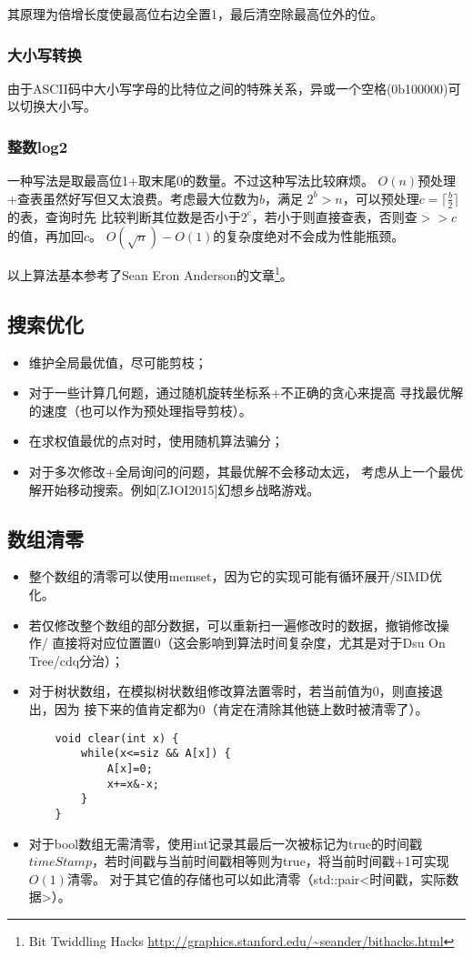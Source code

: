 其原理为倍增长度使最高位右边全置1，最后清空除最高位外的位。
\subsubsection{大小写转换}
由于ASCII码中大小写字母的比特位之间的特殊关系，异或一个空格(0b100000)可以切换大小写。

\subsubsection{整数log2}
一种写法是取最高位1+取末尾0的数量。不过这种写法比较麻烦。
$O(n)$预处理+查表虽然好写但又太浪费。考虑最大位数为$b$，满足
$2^b>n$，可以预处理$c=\lceil \frac{b}{2}\rceil$的表，查询时先
比较判断其位数是否小于$2^c$，若小于则直接查表，否则查$>>c$的值，再加回$c$。
$O(\sqrt{n})-O(1)$的复杂度绝对不会成为性能瓶颈。

以上算法基本参考了Sean Eron Anderson的文章\footnote{
    Bit Twiddling Hacks
    \url{http://graphics.stanford.edu/\~seander/bithacks.html}
}。
\subsection{搜索优化}
\begin{itemize}
    \item 维护全局最优值，尽可能剪枝；
    \item 对于一些计算几何题，通过随机旋转坐标系+不正确的贪心来提高
    寻找最优解的速度（也可以作为预处理指导剪枝）。
    \item 在求权值最优的点对时，使用随机算法骗分；
    \item 对于多次修改+全局询问的问题，其最优解不会移动太远，
    考虑从上一个最优解开始移动搜索。例如[ZJOI2015]幻想乡战略游戏。
\end{itemize}
\subsection{数组清零}
\begin{itemize}
    \item 整个数组的清零可以使用memset，因为它的实现可能有循环展开/SIMD优化。
    \item 若仅修改整个数组的部分数据，可以重新扫一遍修改时的数据，撤销修改操作/
    直接将对应位置置0（这会影响到算法时间复杂度，尤其是对于Dsu On Tree/cdq分治）；
    \item 对于树状数组，在模拟树状数组修改算法置零时，若当前值为0，则直接退出，因为
    接下来的值肯定都为0（肯定在清除其他链上数时被清零了）。
    \begin{lstlisting}
    void clear(int x) {
        while(x<=siz && A[x]) {
            A[x]=0;
            x+=x&-x;
        }
    }
    \end{lstlisting}
    \item 对于bool数组无需清零，使用int记录其最后一次被标记为true的时间戳
    $timeStamp$，若时间戳与当前时间戳相等则为true，将当前时间戳+1可实现$O(1)$清零。
    对于其它值的存储也可以如此清零（std::pair<时间戳，实际数据>）。
\end{itemize}
